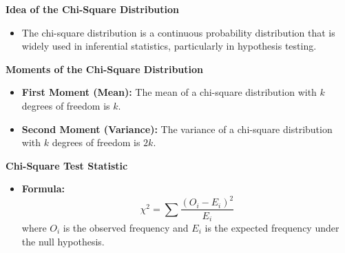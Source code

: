 \documentclass{article}
\begin{document}
\textbf{Idea of the Chi-Square Distribution}
\begin{itemize}
    \item The chi-square distribution is a continuous probability distribution that is widely used in inferential statistics, particularly in hypothesis testing.
\end{itemize}

\textbf{Moments of the Chi-Square Distribution}
\begin{itemize}
    \item \textbf{First Moment (Mean):} The mean of a chi-square distribution with \(k\) degrees of freedom is \(k\).
    \item \textbf{Second Moment (Variance):} The variance of a chi-square distribution with \(k\) degrees of freedom is \(2k\).
\end{itemize}

\textbf{Chi-Square Test Statistic}
\begin{itemize}
    \item \textbf{Formula:}
    \[
    \chi^2 = \sum \frac{(O_i - E_i)^2}{E_i}
    \]
    where \( O_i \) is the observed frequency and \( E_i \) is the expected frequency under the null hypothesis.
\end{itemize}
\end{document}
